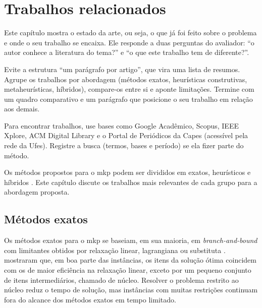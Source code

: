 \chapter{Trabalhos relacionados}
\label{cap:relacionados}

\begin{instrucao}
Este capítulo mostra o estado da arte, ou seja, o que já foi feito sobre o
problema e onde o seu trabalho se encaixa. Ele responde a duas perguntas do
avaliador: ``o autor conhece a literatura do tema?'' e ``o que este trabalho
tem de diferente?''.

Evite a estrutura ``um parágrafo por artigo'', que vira uma lista de resumos.
Agrupe os trabalhos por abordagem (métodos exatos, heurísticas construtivas,
metaheurísticas, híbridos), compare-os entre si e aponte limitações. Termine
com um quadro comparativo e um parágrafo que posicione o seu trabalho em
relação aos demais.

Para encontrar trabalhos, use bases como Google Acadêmico, Scopus, IEEE
Xplore, ACM Digital Library e o Portal de Periódicos da Capes (acessível pela
rede da Ufes). Registre a busca (termos, bases e período) se ela fizer parte do
método.
\end{instrucao}

Os métodos propostos para o \acs{mkp} podem ser divididos em exatos,
heurísticos e híbridos \cite{freville2004multidimensional}. Este capítulo
discute os trabalhos mais relevantes de cada grupo para a abordagem proposta.

\section{Métodos exatos}
\label{sec:relacionados:exatos}

Os métodos exatos para o \acs{mkp} se baseiam, em sua maioria, em
\emph{branch-and-bound} com limitantes obtidos por relaxação linear,
lagrangiana ou substituta \cite{freville2004multidimensional}.
\textcite{puchinger2010multidimensional} mostraram que, em boa parte das
instâncias, os itens da solução ótima coincidem com os de maior eficiência na
relaxação linear, exceto por um pequeno conjunto de itens intermediários,
chamado de núcleo. Resolver o problema restrito ao núcleo reduz o tempo de
solução, mas instâncias com muitas restrições continuam fora do alcance dos
métodos exatos em tempo limitado.

